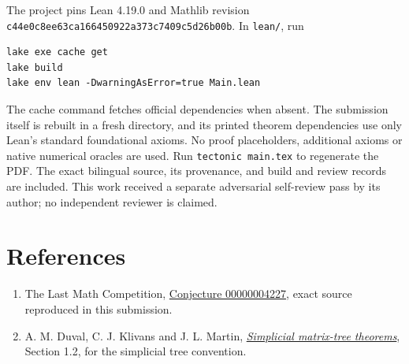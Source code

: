 \documentclass[11pt]{article}
\begin{document}
The project pins Lean 4.19.0 and Mathlib revision\\
\texttt{c44e0c8ee63ca166450922a373c7409c5d26b00b}.
In \texttt{lean/}, run
\begin{verbatim}
lake exe cache get
lake build
lake env lean -DwarningAsError=true Main.lean
\end{verbatim}
The cache command fetches official dependencies when absent. The submission
itself is rebuilt in a fresh directory, and its printed theorem dependencies
use only Lean's standard foundational axioms. No proof placeholders,
additional axioms or native numerical oracles are used.
Run \texttt{tectonic main.tex} to regenerate the PDF.
The exact bilingual source, its provenance, and build and review records
are included. This work received a separate adversarial self-review pass
by its author; no independent reviewer is claimed.

\section*{References}
\begin{enumerate}
\item The Last Math Competition,
\href{https://github.com/The-Last-Math-Competition/The-Last-Math-Competition/blob/9b795e7a94a6076e49a65a6489e1caf9153abd23/conjectures/00000004227.md}{Conjecture 00000004227}, exact source reproduced in this submission.
\item A. M. Duval, C. J. Klivans and J. L. Martin,
\href{https://www.dam.brown.edu/people/cklivans/SST.pdf}{\emph{Simplicial matrix-tree theorems}},
Section 1.2, for the simplicial tree convention.
\end{enumerate}
\end{document}

